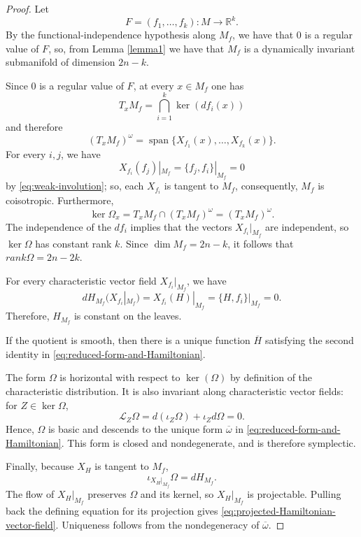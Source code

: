 \documentclass[10pt,a4paper]{amsart}
\begin{document}
\begin{proof}
Let
\[
F=(f_1,\ldots,f_k)\colon M\longrightarrow\mathbb{R}^k.
\]
By the functional-independence hypothesis along $M_f$, we have that $0$ is a regular value of $F$, so, from Lemma \ref{lemma1} we have that $M_f$ is a dynamically invariant submanifold of dimension $2n-k$.

Since $0$ is a regular value of $F$, at every $x\in M_f$ one has
\[
  T_xM_f=\bigcap_{i=1}^k\ker(df_i(x))
\]
and therefore
\begin{equation*}
(T_xM_f)^\omega=\operatorname{span}\bigl\{X_{f_1}(x),\ldots,X_{f_k}(x)\bigr\}.
\label{eq:symplectic-orthogonal}
\end{equation*}
For every $i,j$, we have
\[
  X_{f_i}(f_j)|_{M_f}=\{f_j,f_i\}|_{M_f}=0
\]
by \eqref{eq:weak-involution}; so, each $X_{f_i}$ is tangent to $M_f$, consequently, $M_f$ is coisotropic. Furthermore,
\[
  \ker\Omega_x=T_xM_f\cap(T_xM_f)^\omega=(T_xM_f)^\omega.
\]
The independence of the $df_i$ implies that the vectors $X_{f_i}|_{M_f}$ are independent, so $\ker\Omega$ has constant rank $k$.  Since $\dim M_f=2n-k$, it follows that $rank\Omega=2n-2k$.

For every characteristic vector field $X_{f_i}|_{M_f}$, we have
\[
dH_{M_f}(X_{f_i}|_{M_f})
=X_{f_i}(H)|_{M_f}
=\{H,f_i\}|_{M_f}=0.
\]
Therefore, $H_{M_f}$ is constant on the leaves.

If the quotient is smooth, then there is a unique function $\overline{H}$ satisfying the second identity in
\eqref{eq:reduced-form-and-Hamiltonian}.

The form $\Omega$ is horizontal with respect to $\ker(\Omega)$ by definition of the characteristic distribution.  It is also invariant along characteristic vector fields: for $Z\in\ker\Omega$,
\[
\mathcal L_Z\Omega = d(\iota_Z\Omega)+\iota_Z d\Omega=0.
\]
Hence, $\Omega$ is basic and descends to the unique form
$\overline{\omega}$ in \eqref{eq:reduced-form-and-Hamiltonian}.  This form is closed and nondegenerate, and is therefore symplectic.

Finally, because $X_H$ is tangent to $M_f$,
\[
\iota_{X_H|_{M_f}}\Omega= dH_{M_f}.
\]
The flow of $X_H|_{M_f}$ preserves $\Omega$ and its kernel, so $X_H|_{M_f}$ is projectable. Pulling back the defining equation for its projection gives \eqref{eq:projected-Hamiltonian-vector-field}.  Uniqueness follows from the nondegeneracy of $\overline{\omega}$.
\end{proof}
\end{document}
